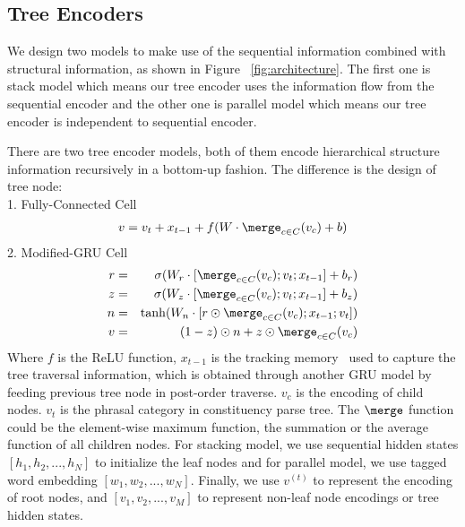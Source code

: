 
\subsection{Tree Encoders}
\label{sec:treeEnc}
We design two models to make use of the sequential information combined with structural information, as shown in Figure ~\ref{fig:architecture}. The first one is stack model which means our tree encoder uses the information flow from the sequential encoder and the other one is parallel model which means our tree encoder is independent to sequential encoder.

There are two tree encoder models, both of them encode hierarchical structure information recursively in a bottom-up fashion. The difference is the design of tree node: \\
1. Fully-Connected Cell
\begin{eqnarray}
v = v_t + x_{t-1} + f(W \cdot \merge_{c \in C}(v_c) + b)
\end{eqnarray}
2. Modified-GRU Cell
\begin{eqnarray}
r &=& \sigma(W_r \cdot [\merge_{c \in C}(v_c);v_t; x_{t-1}] + b_r) \nonumber\\
z &=& \sigma(W_z \cdot [\merge_{c \in C}(v_c);v_t; x_{t-1}] + b_z) \nonumber \\
n &=& \tanh (W_n \cdot [r \odot \merge_{c \in C}(v_c); x_{t-1};v_t]) \nonumber \\
v  &=& (1-z) \odot n + z \odot \merge_{c \in C}(v_c)
\end{eqnarray}
Where $f$ is the ReLU function, $x_{t-1}$ is the tracking memory~\cite{bowman2016fast} used to capture the tree traversal information, which is obtained through another GRU model by feeding previous tree node in post-order traverse. $v_c$ is the encoding of child nodes. $v_t$ is the phrasal category in constituency parse tree. The $\merge$ function could be the element-wise maximum function, the summation or the average function of all children nodes. For stacking model, we use sequential hidden states $[h_1,h_2,...,h_N]$ to initialize the leaf nodes and for parallel model, we use tagged word embedding $[w_1,w_2,...,w_N]$. Finally, we use $v^{(t)}$ to represent the encoding of root nodes, and $[v_1,v_2,...,v_M]$ to represent non-leaf node encodings or tree hidden states.

